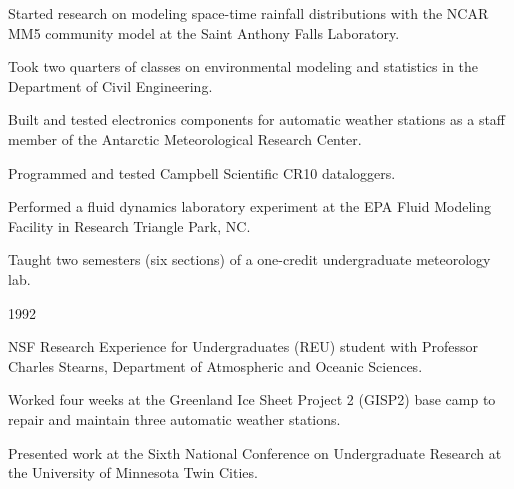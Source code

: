\documentclass[letterpaper]{resume}
\begin{document}
\begin{compactitem}[\itembullet]
  \item Started research on modeling space-time rainfall distributions
    with the NCAR MM5 community model at the Saint Anthony Falls
    Laboratory.
  \item Took two quarters of classes on environmental modeling and
    statistics in the Department of Civil Engineering.
\end{compactitem}

\begin{compactitem}[\itembullet]
  \item Built and tested electronics components for automatic weather
    stations as a staff member of the Antarctic Meteorological
    Research Center.
  \item Programmed and tested Campbell Scientific CR10 dataloggers.
\end{compactitem}

\begin{compactitem}[\itembullet]
  \item Performed a fluid dynamics laboratory experiment at the EPA
    Fluid Modeling Facility in Research Triangle Park, NC.
\end{compactitem}

\begin{compactitem}[\itembullet]
  \item Taught two semesters (six sections) of a one-credit
    undergraduate meteorology lab.
\end{compactitem}

 {1992}
\begin{compactitem}[\itembullet]
  \item NSF Research Experience for Undergraduates (REU) student with
    Professor Charles Stearns, Department of Atmospheric and Oceanic
    Sciences.
  \item Worked four weeks at the Greenland Ice Sheet Project 2 (GISP2)
    base camp to repair and maintain three automatic weather stations.
  \item Presented work at the Sixth National Conference on
    Undergraduate Research at the University of Minnesota Twin Cities.
\end{compactitem}
\end{document}
